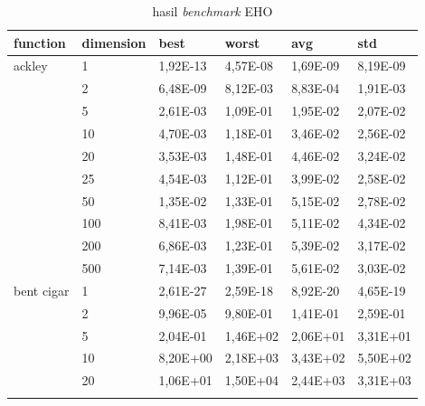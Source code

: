 \begin{longtable}[c]{|m{3.5cm}|l|l|l|l|l|}
\caption{hasil \textit{benchmark} EHO}
\label{tab:eho-result}\\
\hline
function                                & dimension & best       & worst      & avg        & std       \\ \hline
\endfirsthead
%
\endhead
%
\multirow{10}{*}{ackley}                & 1         & 1,92E-13   & 4,57E-08   & 1,69E-09   & 8,19E-09  \\ \cline{2-6} 
                                        & 2         & 6,48E-09   & 8,12E-03   & 8,83E-04   & 1,91E-03  \\ \cline{2-6} 
                                        & 5         & 2,61E-03   & 1,09E-01   & 1,95E-02   & 2,07E-02  \\ \cline{2-6} 
                                        & 10        & 4,70E-03   & 1,18E-01   & 3,46E-02   & 2,56E-02  \\ \cline{2-6} 
                                        & 20        & 3,53E-03   & 1,48E-01   & 4,46E-02   & 3,24E-02  \\ \cline{2-6} 
                                        & 25        & 4,54E-03   & 1,12E-01   & 3,99E-02   & 2,58E-02  \\ \cline{2-6} 
                                        & 50        & 1,35E-02   & 1,33E-01   & 5,15E-02   & 2,78E-02  \\ \cline{2-6} 
                                        & 100       & 8,41E-03   & 1,98E-01   & 5,11E-02   & 4,34E-02  \\ \cline{2-6} 
                                        & 200       & 6,86E-03   & 1,23E-01   & 5,39E-02   & 3,17E-02  \\ \cline{2-6} 
                                        & 500       & 7,14E-03   & 1,39E-01   & 5,61E-02   & 3,03E-02  \\ \hline
\multirow{10}{*}{bent cigar}            & 1         & 2,61E-27   & 2,59E-18   & 8,92E-20   & 4,65E-19  \\ \cline{2-6} 
                                        & 2         & 9,96E-05   & 9,80E-01   & 1,41E-01   & 2,59E-01  \\ \cline{2-6} 
                                        & 5         & 2,04E-01   & 1,46E+02   & 2,06E+01   & 3,31E+01  \\ \cline{2-6} 
                                        & 10        & 8,20E+00   & 2,18E+03   & 3,43E+02   & 5,50E+02  \\ \cline{2-6} 
                                        & 20        & 1,06E+01   & 1,50E+04   & 2,44E+03   & 3,31E+03  \\ \cline{2-6} 

\end{longtable}
